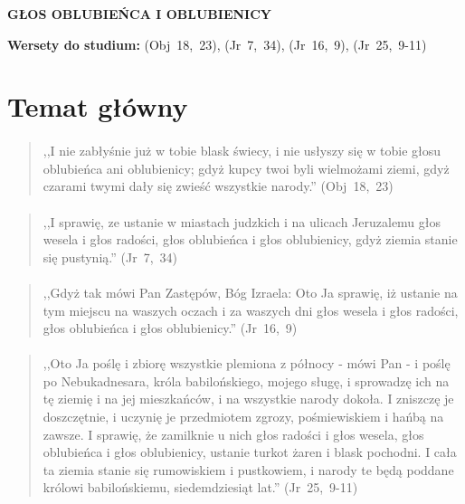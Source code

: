 \documentclass[10pt,a4paper,oneside]{article}
\begin{document}
\centerline{\textbf{\MakeUppercase{Głos Oblubieńca i Oblubienicy}}}
\begin{center}
\textbf{Wersety do studium:} 
\mbox{(Obj 18, 23)}, \mbox{(Jr 7, 34)}, \mbox{(Jr 16, 9)}, \mbox{(Jr 25, 9-11)}
\end{center}
\section{Temat główny}
\paragraph{}
\begin{quote}
,,I nie zabłyśnie już w tobie blask świecy, i nie usłyszy się w tobie głosu oblubieńca ani oblubienicy; gdyż kupcy twoi byli wielmożami ziemi, gdyż czarami twymi dały się zwieść wszystkie narody.'' \mbox{(Obj 18, 23)}
\end{quote}
\paragraph{}
\begin{quote}
,,I sprawię, ze ustanie w miastach judzkich i na ulicach Jeruzalemu głos wesela i głos radości, głos oblubieńca i głos oblubienicy, gdyż ziemia stanie się pustynią.'' \mbox{(Jr 7, 34)}
\end{quote}
\paragraph{}
\begin{quote}
,,Gdyż tak mówi Pan Zastępów, Bóg Izraela: Oto Ja sprawię, iż ustanie na tym miejscu na waszych oczach i za waszych dni głos wesela i głos radości, głos oblubieńca i głos oblubienicy.'' \mbox{(Jr 16, 9)}
\end{quote}
\paragraph{}
\begin{quote}
,,Oto Ja poślę i zbiorę wszystkie plemiona z północy - mówi Pan - i poślę po Nebukadnesara, króla babilońskiego, mojego sługę, i sprowadzę ich na tę ziemię i na jej mieszkańców, i na wszystkie narody dokoła. I zniszczę je doszczętnie, i uczynię je przedmiotem zgrozy, pośmiewiskiem i hańbą na zawsze. I sprawię, że zamilknie u nich głos radości i głos wesela, głos oblubieńca i głos oblubienicy, ustanie turkot żaren i blask pochodni. I cała ta ziemia stanie się rumowiskiem i pustkowiem, i narody te będą poddane królowi babilońskiemu, siedemdziesiąt lat.'' \mbox{(Jr 25, 9-11)}
\end{quote}
\end{document}
